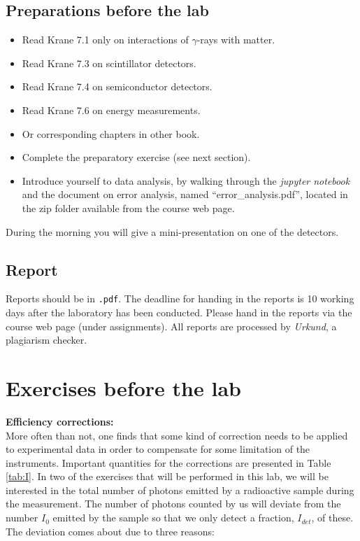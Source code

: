 \documentclass[12pt]{article}
\begin{document}
\subsection*{Preparations before the lab}
\begin{itemize}
  \item Read Krane 7.1 only on interactions of $\gamma$-rays with matter. %
  \item Read Krane 7.3 on scintillator detectors.
  \item Read Krane 7.4 on semiconductor detectors.
  \item Read Krane 7.6 on energy measurements.
  \item Or corresponding chapters in other book.
  \item Complete the preparatory exercise (see next section).
  \item Introduce yourself to data analysis, by walking through the {\it jupyter notebook} and the document on error analysis, named ``error\_analysis.pdf'', located in the zip folder available from the course web page.
\end{itemize}
During the morning you will give a mini-presentation on one of the detectors.

\subsection*{Report}
Reports should be in \texttt{.pdf}. The deadline for handing in the
reports is 10 working days after the laboratory has been conducted.
Please hand in the reports via the course web page (under assignments).
All reports are processed by \textit{Urkund}, a plagiarism checker.


\section*{Exercises before the lab} \label{sec:exe}

{\bf\small Efficiency corrections:}\\
More often than not, one finds that some kind of correction needs to
be applied to experimental data in order to compensate for some
limitation of the instruments. Important quantities for the corrections are presented in Table \ref{tab:I}. In two of the exercises that will be
performed in this lab, we will be interested in the total number of
photons emitted by a radioactive sample during the measurement.  The
number of photons counted by us will deviate from the number $I_0$
emitted by the sample so that we only detect a fraction, $I_{det}$, of
these. The deviation comes about due to three reasons:
\end{document}
